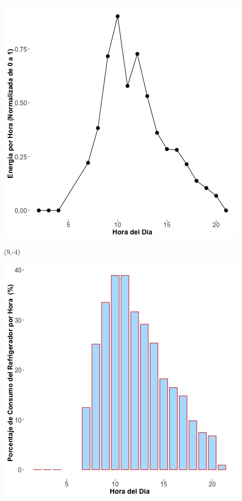 \documentclass{article}\usepackage[]{graphicx}\usepackage[]{color}
\newenvironment{knitrout}{}{} %
\begin{document}
\begin{knitrout}
\color{fgcolor}
\includegraphics[scale=0.75]{figure/A29_fplot_norm_median} 
\end{knitrout}


 \begin{textblock}{1}(9,-4)
\begin{minipage}{20em}
\begingroup

\endgroup
\end{minipage}
\end{textblock}

 \vspace{2cm}

\begin{knitrout}
\color{fgcolor}
\includegraphics[scale=0.65]{figure/A29_fridge_energy_pct.jpg} 
\end{knitrout}
\end{document}
